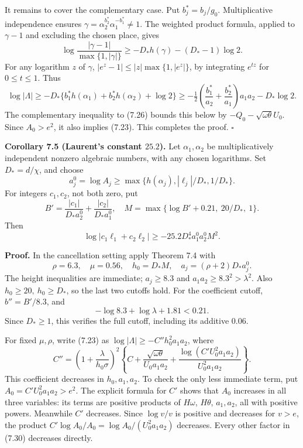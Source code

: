\documentclass[
  11pt,
  a4paper,
]{article}
\begin{document}
It remains to cover the complementary case. Put \(b_j^*=b_j/g_0\).
Multiplicative independence ensures
\(\gamma=\alpha_2^{b_2^*}\alpha_1^{-b_1^*}\ne1\). The weighted product
formula, applied to \(\gamma-1\) and excluding the chosen place, gives
\[
\log\frac{|\gamma-1|}{\max\{1,|\gamma|\}}
\ge-D_*h(\gamma)-(D_*-1)\log2.
\] For any logarithm \(z\) of \(\gamma\),
\(|e^z-1|\le|z|\max\{1,|e^z|\}\), by integrating \(e^{tz}\) for
\(0\le t\le1\). Thus \[
\log|\Lambda|\ge
-D_*\{b_1^*h(\alpha_1)+b_2^*h(\alpha_2)+\log2\}
\ge-\tfrac12\left(\frac{b_1^*}{a_2}+\frac{b_2^*}{a_1}\right)a_1a_2-D_*\log2.
\] The complementary inequality to (7.26) bounds this below by
\(-Q_0-\sqrt{\omega\theta}U_0\). Since \(A_0>e^2\), it also implies
(7.23). This completes the proof. \(\square\)

\textbf{Corollary 7.5 (Laurent's constant \(25.2\)).} Let
\(\alpha_1,\alpha_2\) be multiplicatively independent nonzero algebraic
numbers, with any chosen logarithms. Set \(D_*=d/\chi\), and choose \[
a_j^0=\log A_j\ge\max\{h(\alpha_j),|\ell_j|/D_*,1/D_*\}.
\] For integers \(c_1,c_2\), not both zero, put \[
B'=\frac{|c_1|}{D_*a_2^0}+\frac{|c_2|}{D_*a_1^0},\quad
M=\max\{\log B'+0.21,\ 20/D_*,\ 1\}.
\] Then \[
\log|c_1\ell_1+c_2\ell_2|
\ge-25.2D_*^4a_1^0a_2^0M^2. \tag{7.29}
\]

\textbf{Proof.} In the cancellation setting apply Theorem 7.4 with \[
\rho=6.3,\quad\mu=0.56,\quad
h_0=D_*M,\quad a_j=(\rho+2)D_*a_j^0.
\] The height inequalities are immediate; \(a_j\ge8.3\) and
\(a_1a_2\ge8.3^2>\lambda^2\). Also \(h_0\ge20,\ h_0\ge D_*\), so the
last two cutoffs hold. For the coefficient cutoff, \(b''=B'/8.3\), and
\[
-\log8.3+\log\lambda+1.81<0.21.
\] Since \(D_*\ge1\), this verifies the full cutoff, including its
additive \(0.06\).

For fixed \(\mu,\rho\), write (7.23) as
\(\log|\Lambda|\ge-C''h_0^2a_1a_2\), where \[
C''=\left(1+\frac{\lambda}{h_0\sigma}\right)^2
\left\{C+\frac{\sqrt{\omega\theta}}{U_0a_1a_2}
+\frac{\log(C'U_0^2a_1a_2)}{U_0^2a_1a_2}\right\}. \tag{7.30}
\] This coefficient decreases in \(h_0,a_1,a_2\). To check the only less
immediate term, put \(A_0=C'U_0^2a_1a_2>e^2\). The explicit formula for
\(C'\) shows that \(A_0\) increases in all three variables: its terms
are positive products of \(H\omega\), \(H\theta\), \(a_1,a_2\), all with
positive powers. Meanwhile \(C'\) decreases. Since \(\log v/v\) is
positive and decreases for \(v>e\), the product
\(C'\log A_0/A_0=\log A_0/(U_0^2a_1a_2)\) decreases. Every other factor
in (7.30) decreases directly.
\end{document}
